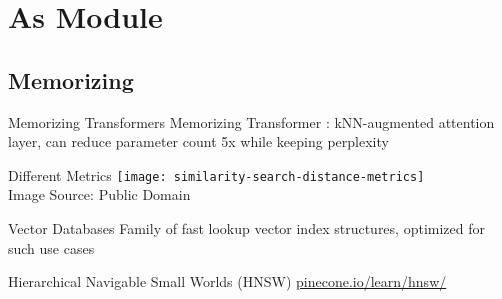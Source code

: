 \section{As Module}

\subsection{Memorizing}


\begin{frame}[c]{Memorizing Transformers}
    Memorizing Transformer \cite{wu_memorizing_2022}: kNN-augmented attention layer, can reduce parameter count 5x while keeping perplexity
\end{frame}


\begin{frame}[c]{Different Metrics}
    \texttt{[image: similarity-search-distance-metrics]} \\
    Image Source: Public Domain
\end{frame}

\begin{frame}[c]{Vector Databases}
    Family of fast lookup vector index structures, optimized for such use cases

    Hierarchical Navigable Small Worlds (HNSW)
    \url{pinecone.io/learn/hnsw/}
\end{frame}
